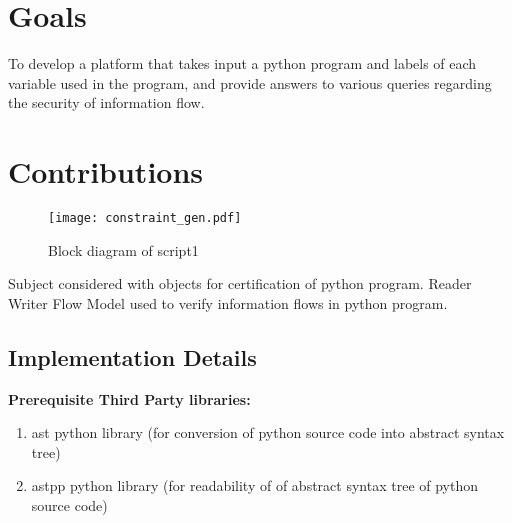 \section{Goals}
To develop a platform that takes input a python program and labels of each variable used in the program, and provide answers to various queries regarding the security of information flow.   

\section{Contributions}
\begin{figure}
	\texttt{[image: constraint\_gen.pdf]}
	\centering
	\caption{Block diagram of script1}
	\label{fig:script1}
\end{figure}
Subject considered with objects for certification of python program. Reader Writer Flow Model \cite{rwfm} used to verify information flows in python program.
\subsection{Implementation Details}
\textbf{Prerequisite Third Party libraries:}
\begin{enumerate}
	\item ast python library (for conversion of python source code into abstract syntax tree)
	\item astpp python library (for readability of of abstract syntax tree of python source code)
\end{enumerate}

